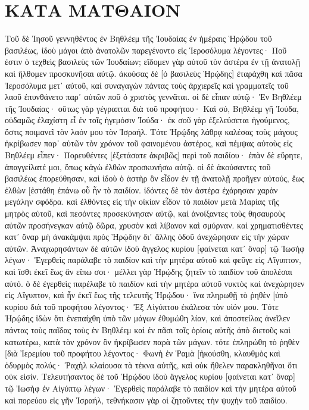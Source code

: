 \section{ΚΑΤΑ ΜΑΤΘΑΙΟΝ}
Τοῦ δὲ Ἰησοῦ γεννηθέντος ἐν Βηθλέεμ τῆς Ἰουδαίας ἐν ἡμέραις Ἡρῴδου τοῦ βασιλέως, ἰδοὺ μάγοι ἀπὸ ἀνατολῶν παρεγένοντο εἰς Ἱεροσόλυμα 
λέγοντες· Ποῦ ἐστιν ὁ τεχθεὶς βασιλεὺς τῶν Ἰουδαίων; εἴδομεν γὰρ αὐτοῦ τὸν ἀστέρα ἐν τῇ ἀνατολῇ καὶ ἤλθομεν προσκυνῆσαι αὐτῷ. 
ἀκούσας δὲ [ὁ βασιλεὺς Ἡρῴδης] ἐταράχθη καὶ πᾶσα Ἱεροσόλυμα μετ᾽ αὐτοῦ, 
καὶ συναγαγὼν πάντας τοὺς ἀρχιερεῖς καὶ γραμματεῖς τοῦ λαοῦ ἐπυνθάνετο παρ᾽ αὐτῶν ποῦ ὁ χριστὸς γεννᾶται. 
οἱ δὲ εἶπαν αὐτῷ· Ἐν Βηθλέεμ τῆς Ἰουδαίας· οὕτως γὰρ γέγραπται διὰ τοῦ προφήτου· 
Καὶ σύ, Βηθλέεμ γῆ Ἰούδα, οὐδαμῶς ἐλαχίστη εἶ ἐν τοῖς ἡγεμόσιν Ἰούδα· ἐκ σοῦ γὰρ ἐξελεύσεται ἡγούμενος, ὅστις ποιμανεῖ τὸν λαόν μου τὸν Ἰσραήλ. 
Τότε Ἡρῴδης λάθρᾳ καλέσας τοὺς μάγους ἠκρίβωσεν παρ᾽ αὐτῶν τὸν χρόνον τοῦ φαινομένου ἀστέρος, 
καὶ πέμψας αὐτοὺς εἰς Βηθλέεμ εἶπεν· Πορευθέντες [ἐξετάσατε ἀκριβῶς] περὶ τοῦ παιδίου· ἐπὰν δὲ εὕρητε, ἀπαγγείλατέ μοι, ὅπως κἀγὼ ἐλθὼν προσκυνήσω αὐτῷ. 
οἱ δὲ ἀκούσαντες τοῦ βασιλέως ἐπορεύθησαν, καὶ ἰδοὺ ὁ ἀστὴρ ὃν εἶδον ἐν τῇ ἀνατολῇ προῆγεν αὐτούς, ἕως ἐλθὼν [ἐστάθη ἐπάνω οὗ ἦν τὸ παιδίον. 
ἰδόντες δὲ τὸν ἀστέρα ἐχάρησαν χαρὰν μεγάλην σφόδρα. 
καὶ ἐλθόντες εἰς τὴν οἰκίαν εἶδον τὸ παιδίον μετὰ Μαρίας τῆς μητρὸς αὐτοῦ, καὶ πεσόντες προσεκύνησαν αὐτῷ, καὶ ἀνοίξαντες τοὺς θησαυροὺς αὐτῶν προσήνεγκαν αὐτῷ δῶρα, χρυσὸν καὶ λίβανον καὶ σμύρναν. 
καὶ χρηματισθέντες κατ᾽ ὄναρ μὴ ἀνακάμψαι πρὸς Ἡρῴδην δι᾽ ἄλλης ὁδοῦ ἀνεχώρησαν εἰς τὴν χώραν αὐτῶν. 
Ἀναχωρησάντων δὲ αὐτῶν ἰδοὺ ἄγγελος κυρίου [φαίνεται κατ᾽ ὄναρ] τῷ Ἰωσὴφ λέγων· Ἐγερθεὶς παράλαβε τὸ παιδίον καὶ τὴν μητέρα αὐτοῦ καὶ φεῦγε εἰς Αἴγυπτον, καὶ ἴσθι ἐκεῖ ἕως ἂν εἴπω σοι· μέλλει γὰρ Ἡρῴδης ζητεῖν τὸ παιδίον τοῦ ἀπολέσαι αὐτό. 
ὁ δὲ ἐγερθεὶς παρέλαβε τὸ παιδίον καὶ τὴν μητέρα αὐτοῦ νυκτὸς καὶ ἀνεχώρησεν εἰς Αἴγυπτον, 
καὶ ἦν ἐκεῖ ἕως τῆς τελευτῆς Ἡρῴδου· ἵνα πληρωθῇ τὸ ῥηθὲν [ὑπὸ κυρίου διὰ τοῦ προφήτου λέγοντος· Ἐξ Αἰγύπτου ἐκάλεσα τὸν υἱόν μου. 
Τότε Ἡρῴδης ἰδὼν ὅτι ἐνεπαίχθη ὑπὸ τῶν μάγων ἐθυμώθη λίαν, καὶ ἀποστείλας ἀνεῖλεν πάντας τοὺς παῖδας τοὺς ἐν Βηθλέεμ καὶ ἐν πᾶσι τοῖς ὁρίοις αὐτῆς ἀπὸ διετοῦς καὶ κατωτέρω, κατὰ τὸν χρόνον ὃν ἠκρίβωσεν παρὰ τῶν μάγων. 
τότε ἐπληρώθη τὸ ῥηθὲν [διὰ Ἰερεμίου τοῦ προφήτου λέγοντος· 
Φωνὴ ἐν Ῥαμὰ [ἠκούσθη, κλαυθμὸς καὶ ὀδυρμὸς πολύς· Ῥαχὴλ κλαίουσα τὰ τέκνα αὐτῆς, καὶ οὐκ ἤθελεν παρακληθῆναι ὅτι οὐκ εἰσίν. 
Τελευτήσαντος δὲ τοῦ Ἡρῴδου ἰδοὺ ἄγγελος κυρίου [φαίνεται κατ᾽ ὄναρ] τῷ Ἰωσὴφ ἐν Αἰγύπτῳ 
λέγων· Ἐγερθεὶς παράλαβε τὸ παιδίον καὶ τὴν μητέρα αὐτοῦ καὶ πορεύου εἰς γῆν Ἰσραήλ, τεθνήκασιν γὰρ οἱ ζητοῦντες τὴν ψυχὴν τοῦ παιδίου. 
